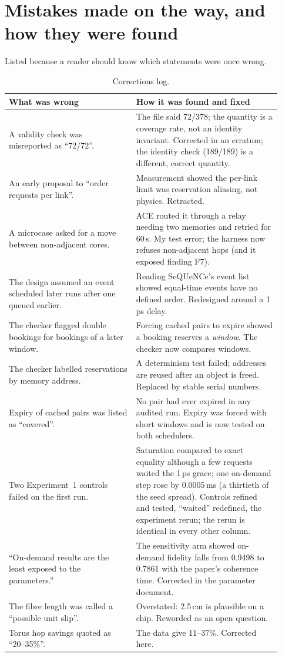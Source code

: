 \section{Mistakes made on the way, and how they were found}
\label{sec:corrections}
Listed because a reader should know which statements were once wrong.
\begin{table}[H]
\centering\small
\begin{tabular}{@{}p{0.43\linewidth}p{0.49\linewidth}@{}}
\toprule
What was wrong & How it was found and fixed \\ \midrule
A validity check was misreported as ``72/72''. & The file said 72/378; the quantity is a coverage rate, not an identity invariant. Corrected in an erratum; the identity check (189/189) is a different, correct quantity. \\
An early proposal to ``order requests per link''. & Measurement showed the per-link limit was reservation aliasing, not physics. Retracted. \\
A microcase asked for a move between non-adjacent cores. & ACE routed it through a relay needing two memories and retried for 60\,s. My test error; the harness now refuses non-adjacent hops (and it exposed finding F7). \\
The design assumed an event scheduled later runs after one queued earlier. & Reading SeQUeNCe's event list showed equal-time events have no defined order. Redesigned around a 1\,ps delay. \\
The checker flagged double bookings for bookings of a later window. & Forcing cached pairs to expire showed a booking reserves a \emph{window}. The checker now compares windows. \\
The checker labelled reservations by memory address. & A determinism test failed; addresses are reused after an object is freed. Replaced by stable serial numbers. \\
Expiry of cached pairs was listed as ``covered''. & No pair had ever expired in any audited run. Expiry was forced with short windows and is now tested on both schedulers. \\
Two Experiment~1 controls failed on the first run. & Saturation compared to exact equality although a few requests waited the 1\,ps grace; one on-demand step rose by 0.0005\,ms (a thirtieth of the seed spread). Controls refined and tested, ``waited'' redefined, the experiment rerun; the rerun is identical in every other column. \\
``On-demand results are the least exposed to the parameters.'' & The sensitivity arm showed on-demand fidelity falls from 0.9498 to 0.7861 with the paper's coherence time. Corrected in the parameter document. \\
The fibre length was called a ``possible unit slip''. & Overstated: 2.5\,cm is plausible on a chip. Reworded as an open question. \\
Torus hop savings quoted as ``20--35\%''. & The data give 11--37\%. Corrected here. \\
\bottomrule
\end{tabular}
\caption{Corrections log.}
\end{table}

